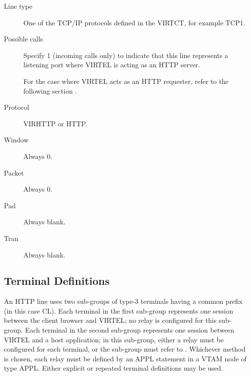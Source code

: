 \documentclass[letterpaper,10pt,english]{sphinxmanual}
\begin{document}
\begin{description}
\item[{Line type}] \leavevmode
One of the TCP/IP protocols defined in the VIRTCT, for example TCP1.

\item[{Possible calls}] \leavevmode
Specify 1 (incoming calls only) to indicate that this line
represents a listening port where VIRTEL is acting as an HTTP
server.

For the case where VIRTEL acts as an HTTP requester, refer to the following section {\hyperref[\detokenize{connectivity_guide:v461cn-httpoutbound}]{}}.

\item[{Protocol}] \leavevmode
VIRHTTP or HTTP.

\item[{Window}] \leavevmode
Always 0.

\item[{Packet}] \leavevmode
Always 0.

\item[{Pad}] \leavevmode
Always blank.

\item[{Tran}] \leavevmode
Always blank.

\end{description}

\ignorespaces 

\subsection{Terminal Definitions}
\label{\detokenize{connectivity_guide:terminal-definitions}}\label{\detokenize{connectivity_guide:index-12}}
An HTTP line uses two sub-groups of type-3 terminals having a common prefix (in this case CL). Each terminal in the first sub-group represents one session between the client browser and VIRTEL; no relay is configured for this sub-group. Each terminal in the second sub-group represents one session between VIRTEL and a host application; in this sub-group, either a relay must be configured for each terminal, or the sub-group must refer to {\hyperref[\detokenize{connectivity_guide:v461cn-logicalpool}]{}}. Whichever method is chosen, each relay must be defined by an APPL statement in a VTAM node of type APPL. Either explicit or repeated terminal definitions may be used.
\end{document}
